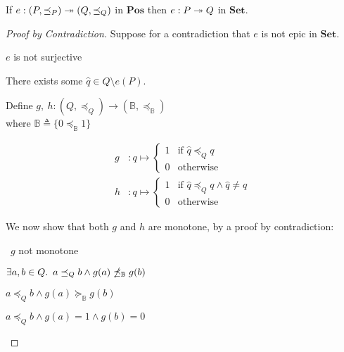 \begin{lemma}\label{lemma:epic-poset-set}
  If $e : (P, \preceq_P) \twoheadrightarrow (Q, \preceq_Q)$ in $\mathbf{Pos}$ then $e : P \twoheadrightarrow Q$ in $\mathbf{Set}$.

  \begin{proof}[Proof by Contradiction]
    Suppose for a contradiction that $e$ is not epic in $\mathbf{Set}$.

    \begin{itemize}
      \step[\iffs] $e$ is not surjective

      \step[\imps] There exists some $\widehat{q}\in Q\setminus e(P)$.

      \addtolength{\itemsep}{.5\baselineskip}
      \step
        Define $g,~h : (Q, \preceq_Q) \to (\mathbb{B}, \preceq_{\mathbb{B}})$\\
        where $\mathbb{B}\triangleq\{0 \preceq_{\mathbb{B}} 1\}$

        \begin{align*}
          g & : q \mapsto
          \begin{cases}
            1 & \text{if }\widehat{q}\preceq_Q q\\
            0 & \text{otherwise}
          \end{cases}\\
          h & : q \mapsto
          \begin{cases}
            1 & \text{if }\widehat{q}\preceq_Q q\wedge\widehat{q}\neq q\\
            0 & \text{otherwise}
          \end{cases}
        \end{align*}

        We now show that both $g$ and $h$ are monotone, by a proof by contradiction:

      \addtolength{\itemsep}{-.5\baselineskip}
      \step
        \begin{itemize}
          \subp{\star}
            \Ass~$g$ not monotone
            \marginnote{\Hyp}

          \step[\imps]
            $\exists a, b\in Q\ldotp~a\preceq_Qb\wedge g(a)\npreceq_{\mathbb{B}}g(b)$

          \step[\imps]
            $a\preceq_Qb\wedge g(a)\succeq_{\mathbb{B}}g(b)$

          \step[\imps]
            $a\preceq_Qb\wedge g(a) = 1\wedge g(b) = 0$


\end{itemize}
\end{itemize}
\end{proof}
\end{lemma}
